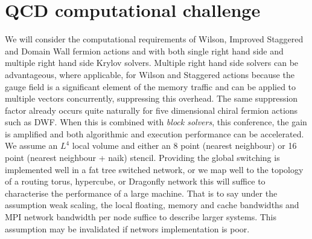 \documentclass{PoS}
\begin{document}
\section{QCD computational challenge}

We will consider the computational requirements of Wilson, Improved Staggered and Domain Wall fermion actions and with both 
single right hand side and multiple right hand side Krylov solvers. 
Multiple right hand side solvers can be advantageous, where applicable, for Wilson and Staggered 
actions because the gauge field is a significant element of the memory traffic and can be applied to multiple
vectors concurrently, suppressing this overhead. 
The same suppression factor already occurs quite naturally for five dimensional chiral fermion actions such as DWF.
When this is combined with \emph{block solvers}\cite{Wagner}, this conference, the gain is amplified and both algorithmic and execution
performance can be accelerated.
We assume an $L^4$ local volume and either an  8 point (nearest neighbour) or 16 point (nearest neighbour + naik) stencil.
Providing the global switching is implemented well in a fat tree switched network, or we map well to the topology of
a routing torus, hypercube, or Dragonfly network this will suffice to characterise the performance of a large
machine. That is to say under the assumption weak scaling, the local floating, memory and cache bandwidths and MPI network bandwidth per node
suffice to describe larger systems. This assumption may be invalidated if networs implementation is poor. 
\end{document}
